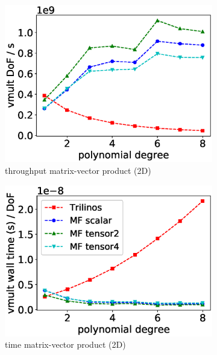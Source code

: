 \documentclass[AMA,STIX1COL]{WileyNJD-v2}
\begin{document}
\begin{figure}
  \centering
  \begin{subfigure}[b]{0.32\textwidth}
      \centering
      \includegraphics[width=\textwidth]{CSL_Munich_throughput2d-nolables.eps}
      \caption{throughput matrix-vector product (2D)}
  \end{subfigure}
  \begin{subfigure}[b]{0.32\textwidth}
      \centering
      \includegraphics[width=\textwidth]{CSL_Munich_timing2d.eps}
      \caption{time matrix-vector product (2D)}
      \label{fig:benchmark_miehe_CSL_vmult2}
  \end{subfigure}
  \begin{subfigure}[b]{0.32\textwidth}
      \centering

\end{subfigure}
\end{figure}
\end{document}

